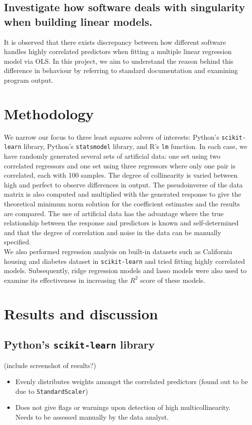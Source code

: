 \documentclass[12pt]{article}
\begin{document}
	
	\subsection{Investigate how software deals with singularity when building linear models.}
	
	It is observed that there exists discrepancy between how different software handles highly correlated predictors when fitting a multiple linear regression model via OLS. In this project, we aim to understand the reason behind this difference in behaviour by referring to standard documentation and examining program output. 
	
	\pagebreak
	
	\section{Methodology}
	
	We narrow our focus to three least squares solvers of interests: Python's \texttt{scikit-learn} library, Python's \texttt{statsmodel} library, and R's \texttt{lm} function. In each case, we have randomly generated several sets of artificial data: one set using two correlated regressors and one set using three regressors where only one pair is correlated, each with 100 samples. The degree of collinearity is varied between high and perfect to observe differences in output. The pseudoinverse of the data matrix is also computed and multiplied with the generated response to give the theoretical minimum norm solution for the coefficient estimates and the results are compared. The use of artificial data has the advantage where the true relationship between the response and predictors is known and self-determined and that the degree of correlation and noise in the data can be manually specified.\\
	
	We also performed regression analysis on built-in datasets such as California housing and diabetes dataset in \texttt{scikit-learn} and tried fitting highly correlated models. Subsequently, ridge regression models and lasso models were also used to examine its effectiveness in increasing the $R^2$ score of these models.
	
	
	\section{Results and discussion}
	\subsection{Python's \texttt{scikit-learn} library}
	(include screenshot of results?)
	\begin{itemize}
		\item Evenly distributes weights amongst the correlated predictors (found out to be due to \texttt{StandardScaler})
		\item Does not give flags or warnings upon detection of high multicollinearity. Needs to be assessed manually by the data analyst.
	\end{itemize}
	
\end{document}

